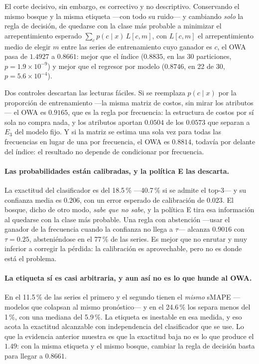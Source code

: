 El corte decisivo, sin embargo, es correctivo y no descriptivo. Conservando el mismo
bosque y la misma etiqueta ---con todo su ruido--- y cambiando \emph{solo} la regla de
decisión, de quedarse con la clase más probable a minimizar el arrepentimiento esperado
$\sum_c p(c\mid x)\,L[c,m]$, con $L[c,m]$ el arrepentimiento medio de elegir $m$ entre
las series de entrenamiento cuyo ganador es $c$, el OWA pasa de $1.4927$ a
$\mathbf{0.8661}$: mejor que el índice ($0.8835$, en las 30 particiones,
$p=1.9\times10^{-9}$) y mejor que el regresor por modelo ($0.8746$, en 22 de 30,
$p=5.6\times10^{-4}$).

Dos controles descartan las lecturas fáciles. Si se reemplaza $p(c\mid x)$ por la
proporción de entrenamiento ---la misma matriz de costos, sin mirar los atributos--- el
OWA es $0.9165$, que es la regla por frecuencia: la estructura de costos por sí sola no
compra nada, y los atributos aportan $0.0504$ de los $0.0573$ que separan a $E_3$ del
modelo fijo. Y si la matriz se estima una sola vez para todas las frecuencias en lugar de
una por frecuencia, el OWA es $0.8814$, todavía por delante del índice: el resultado no
depende de condicionar por frecuencia.

\paragraph{Las probabilidades están calibradas, y la política E las descarta.} La
exactitud del clasificador es del 18.5\,\% ---40.7\,\% si se admite el top-3--- y su
confianza media es $0.206$, con un error esperado de calibración de $0.023$. El bosque,
dicho de otro modo, \emph{sabe que no sabe}, y la política E tira esa información al
quedarse con la clase más probable. Una regla con abstención ---usar el ganador de la
frecuencia cuando la confianza no llega a $\tau$--- alcanza $0.9016$ con $\tau=0.25$,
absteniéndose en el 77\,\% de las series. Es mejor que no enrutar y muy inferior a
corregir la pérdida: la calibración es aprovechable, pero no es donde está el problema.

\paragraph{La etiqueta sí es casi arbitraria, y aun así no es lo que hunde al OWA.} En el
11.5\,\% de las series el primero y el segundo tienen el \emph{mismo} sMAPE ---modelos
que colapsan al mismo pronóstico--- y en el 24.6\,\% los separa menos del 1\,\%, con
una mediana del 5.9\,\%. La etiqueta es inestable en esa medida, y eso acota la
exactitud alcanzable con independencia del clasificador que se use. Lo que la evidencia
anterior muestra es que la exactitud baja no es lo que produce el $1.49$: con la misma
etiqueta y el mismo bosque, cambiar la regla de decisión basta para llegar a $0.8661$.

